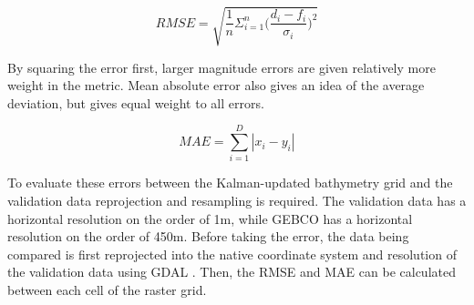 $$  RMSE = \sqrt{\frac{1}{n}\Sigma_{i=1}^{n}{\Big(\frac{d_i -f_i}{\sigma_i}\Big)^2}}  $$

By squaring the error first, larger magnitude errors are given relatively more weight in the metric. Mean absolute error also gives an idea of the average deviation, but gives equal weight to all errors.

$$ MAE = \sum_{i=1}^{D}|x_i-y_i| $$

To evaluate these errors between the Kalman-updated bathymetry grid and the validation data reprojection and resampling is required. The validation data has a horizontal resolution on the order of 1m, while GEBCO has a horizontal resolution on the order of 450m. Before taking the error, the data being compared is first reprojected into the native coordinate system and resolution of the validation data using GDAL \parencite{rouault_even_2022_6352176}. Then, the RMSE and MAE can be calculated between each cell of the raster grid.


